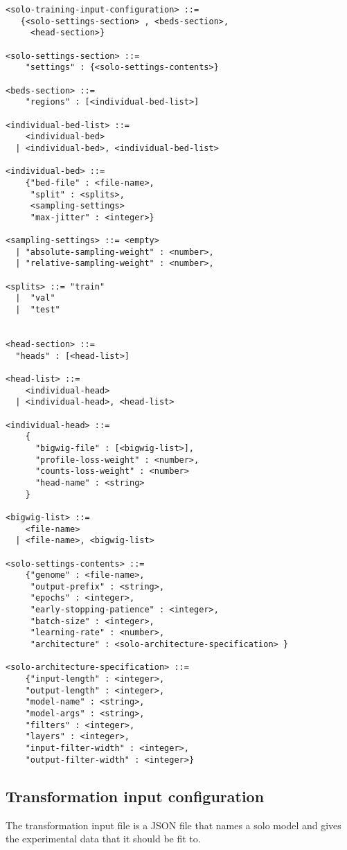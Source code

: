 \documentclass{article}
\begin{document}
\begin{lstlisting}
<solo-training-input-configuration> ::= 
   {<solo-settings-section> , <beds-section>, 
     <head-section>}

<solo-settings-section> ::= 
    "settings" : {<solo-settings-contents>}

<beds-section> ::= 
    "regions" : [<individual-bed-list>]

<individual-bed-list> ::= 
    <individual-bed> 
  | <individual-bed>, <individual-bed-list>

<individual-bed> ::= 
    {"bed-file" : <file-name>,
     "split" : <splits>,
     <sampling-settings>
     "max-jitter" : <integer>}

<sampling-settings> ::= <empty>
  | "absolute-sampling-weight" : <number>,
  | "relative-sampling-weight" : <number>,

<splits> ::= "train"
  |  "val" 
  |  "test"


<head-section> ::= 
  "heads" : [<head-list>]

<head-list> ::= 
    <individual-head>
  | <individual-head>, <head-list>

<individual-head> ::=
    {
      "bigwig-file" : [<bigwig-list>],
      "profile-loss-weight" : <number>,
      "counts-loss-weight" : <number>
      "head-name" : <string>
    }

<bigwig-list> ::=
    <file-name> 
  | <file-name>, <bigwig-list>

<solo-settings-contents> ::= 
    {"genome" : <file-name>, 
     "output-prefix" : <string>, 
     "epochs" : <integer>, 
     "early-stopping-patience" : <integer>, 
     "batch-size" : <integer>, 
     "learning-rate" : <number>, 
     "architecture" : <solo-architecture-specification> } 

<solo-architecture-specification> ::= 
    {"input-length" : <integer>, 
    "output-length" : <integer>,
    "model-name" : <string>,
    "model-args" : <string>,
    "filters" : <integer>,
    "layers" : <integer>,
    "input-filter-width" : <integer>,
    "output-filter-width" : <integer>}
\end{lstlisting}
                    

\subsection{Transformation input configuration}
The transformation input file is a JSON file that names a solo model and gives the experimental data that it should be fit to. 
\end{document}
